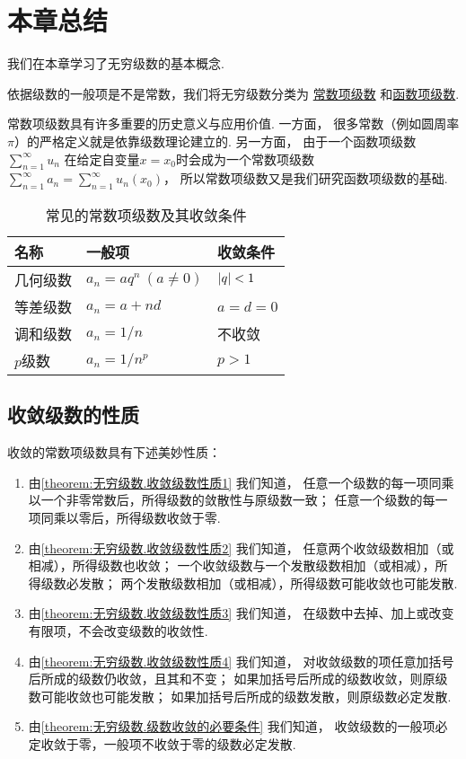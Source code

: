 \section{本章总结}

我们在本章学习了无穷级数的基本概念.

依据级数的一般项是不是常数，我们将无穷级数分类为%
\hyperref[definition:无穷级数.常数项级数的定义]{常数项级数}%
和\hyperref[definition:无穷级数.实函数项级数的概念]{函数项级数}.

常数项级数具有许多重要的历史意义与应用价值.
一方面，
很多常数（例如圆周率\(\pi\)）的严格定义就是依靠级数理论建立的.
另一方面，
由于一个函数项级数\(\sum_{n=1}^\infty u_n\)%
在给定自变量\(x=x_0\)时会成为一个常数项级数\(\sum_{n=1}^\infty a_n
= \sum_{n=1}^\infty u_n(x_0)\)，
所以常数项级数又是我们研究函数项级数的基础.

\begin{table}[h]
	\centering
	\begin{tabular}{*3l}
		\hline
		名称 & 一般项 & 收敛条件 \\ \hline
		几何级数 & \(a_n = a q^n\ (a\neq0)\) & \(\abs{q}<1\) \\
		等差级数 & \(a_n = a + n d\) & \(a = d = 0\) \\
		调和级数 & \(a_n = 1/n\) & 不收敛 \\
		\(p\)级数 & \(a_n = 1/n^p\) & \(p > 1\) \\
		\hline
	\end{tabular}
	\caption{常见的常数项级数及其收敛条件}
\end{table}

\subsection*{收敛级数的性质}
收敛的常数项级数具有下述美妙性质：
\begin{enumerate}
	\item 由\cref{theorem:无穷级数.收敛级数性质1} 我们知道，
	任意一个级数的每一项同乘以一个非零常数后，所得级数的敛散性与原级数一致；
	任意一个级数的每一项同乘以零后，所得级数收敛于零.

	\item 由\cref{theorem:无穷级数.收敛级数性质2} 我们知道，
	任意两个收敛级数相加（或相减），所得级数也收敛；
	一个收敛级数与一个发散级数相加（或相减），所得级数必发散；
	两个发散级数相加（或相减），所得级数可能收敛也可能发散.

	\item 由\cref{theorem:无穷级数.收敛级数性质3} 我们知道，
	在级数中去掉、加上或改变有限项，不会改变级数的收敛性.

	\item 由\cref{theorem:无穷级数.收敛级数性质4} 我们知道，
	对收敛级数的项任意加括号后所成的级数仍收敛，且其和不变；
	如果加括号后所成的级数收敛，则原级数可能收敛也可能发散；
	如果加括号后所成的级数发散，则原级数必定发散.

	\item 由\cref{theorem:无穷级数.级数收敛的必要条件} 我们知道，
	收敛级数的一般项必定收敛于零，一般项不收敛于零的级数必定发散.
\end{enumerate}

